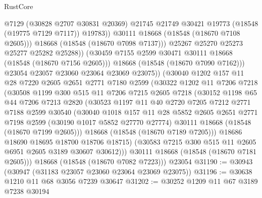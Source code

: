 \begin{lexlean}{RustCore}
\begin{coremodule}
                        @7129
                        (@30828 @2707 @30831 @20369)
                        @21745
                        @21749
                        @30421
                        @19773
                        (@18548 (@19775 @7129 @7117))
                        @19783))
                    @30111
                    @18668
                    (@18548 (@18670 @7108 @2605)))
                  @18668
                  (@18548 (@18670 @7098 @7137)))
                @25267
                @25270
                @25273
                @25277
                @25282
                @25288))
            (@30459 @7155 @2599 @30471 @30111 @18668 (@18548 (@18670 @7156 @2605)))
            @18668
            (@18548 (@18670 @7090 @7162)))
          @23054
          @23057
          @23060
          @23064
          @23069
          @23075))
      (@30040
        @1202
        @157
        @11
        @28
        @7220
        @2605
        @2651
        @2771
        @7180
        @2599
        (@30322
          @1202
          @11
          @7206
          @7218
          (@30508
            @1199
            @300
            @515
            @11
            @7206
            @7215
            @2605
            @7218
            (@30152
              @1198
              @65
              @44
              @7206
              @7213
              @2820
              (@30523
                @1197
                @11
                @40
                @2720
                @7205
                @7212
                @2771
                @7188
                @2599
                @30540
                (@30040
                  @1018
                  @157
                  @11
                  @28
                  @5852
                  @2605
                  @2651
                  @2771
                  @7198
                  @2599
                  (@30190 @1017 @5852 @27770 @27774)
                  @30111
                  @18668
                  (@18548 (@18670 @7199 @2605)))
                @18668
                (@18548 (@18670 @7189 @7205)))
              @18686
              @18690
              @18695
              @18700
              @18706
              @18715)
            (@30583 @7215 @300 @515 @11 @2605 @6951 @2605 @3189 @30607 @30612)))
        @30111
        @18668
        (@18548 (@18670 @7181 @2605)))
      @18668
      (@18548 (@18670 @7082 @7223)))
    @23054
@31190 := @30943 (@30947 (@31183 @23057 @23060 @23064 @23069 @23075))
@31196 := @30638 @1210 @11 @68 @3056 @7239 @30647
@31202 := @30252 @1209 @11 @67 @3189 @7238 @30194

\end{coremodule}
\end{lexlean}
